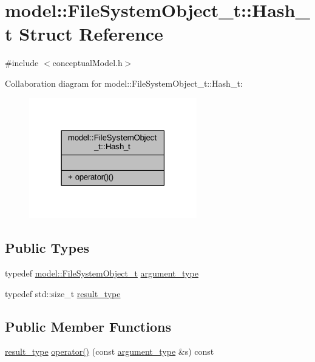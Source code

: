 \hypertarget{structmodel_1_1_file_system_object__t_1_1_hash__t}{}\section{model\+:\+:File\+System\+Object\+\_\+t\+:\+:Hash\+\_\+t Struct Reference}
\label{structmodel_1_1_file_system_object__t_1_1_hash__t}


{\ttfamily \#include $<$conceptual\+Model.\+h$>$}



Collaboration diagram for model\+:\+:File\+System\+Object\+\_\+t\+:\+:Hash\+\_\+t\+:
\nopagebreak
\begin{figure}[H]
\begin{center}
\leavevmode
\includegraphics[width=207pt]{structmodel_1_1_file_system_object__t_1_1_hash__t__coll__graph}
\end{center}
\end{figure}
\subsection*{Public Types}
\begin{DoxyCompactItemize}
\item 
typedef \hyperlink{structmodel_1_1_file_system_object__t}{model\+::\+File\+System\+Object\+\_\+t} \hyperlink{structmodel_1_1_file_system_object__t_1_1_hash__t_a11064641592b3b3c900a934b851c1c18}{argument\+\_\+type}
\item 
typedef std\+::size\+\_\+t \hyperlink{structmodel_1_1_file_system_object__t_1_1_hash__t_aae00910b8355e130db141d3440d01697}{result\+\_\+type}
\end{DoxyCompactItemize}
\subsection*{Public Member Functions}
\begin{DoxyCompactItemize}
\item 
\hyperlink{structmodel_1_1_file_system_object__t_1_1_hash__t_aae00910b8355e130db141d3440d01697}{result\+\_\+type} \hyperlink{structmodel_1_1_file_system_object__t_1_1_hash__t_a5e7e91b1aefc6b1adb198975bbe8b008}{operator()} (const \hyperlink{structmodel_1_1_file_system_object__t_1_1_hash__t_a11064641592b3b3c900a934b851c1c18}{argument\+\_\+type} \&s) const 
\end{DoxyCompactItemize}


